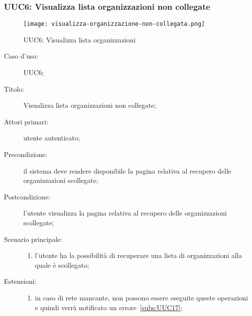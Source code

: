 \documentclass[../../../analisi-dei-requisiti.tex]{subfiles}
\begin{document}
\subsubsection{UUC6: Visualizza lista organizzazioni non collegate}%
\label{subs:UUC6}

\begin{figure}[H]
  \centering
  \texttt{[image: visualizza-organizzazione-non-collegata.png]}
  \caption{UUC6: Visualizza lista organizzazioni}%
  \label{fig:UUC6}
\end{figure}

\begin{description}
  \item[Caso d’uso:] UUC6;
  \item[Titolo:] Visualizza lista organizzazioni non collegate;
  \item[Attori primari:] utente autenticato;
  \item[Precondizione:] il sistema deve rendere disponibile la pagina relativa al recupero delle organizzazioni scollegate;
  \item[Postcondizione:] l'utente visualizza la pagina relativa al recupero delle organizzazioni scollegate;
  \item[Scenario principale:]
        \begin{enumerate}
          \item l'utente ha la possibilità di recuperare una lista di organizzazioni alla quale è scollegato;
        \end{enumerate}
  \item[Estensioni:]
        \begin{enumerate}
          \item in caso di rete mancante, non possono essere eseguite queste operazioni e quindi verrà notificato un errore~\ref{subs:UUC17};
        \end{enumerate}
\end{description}
\end{document}
